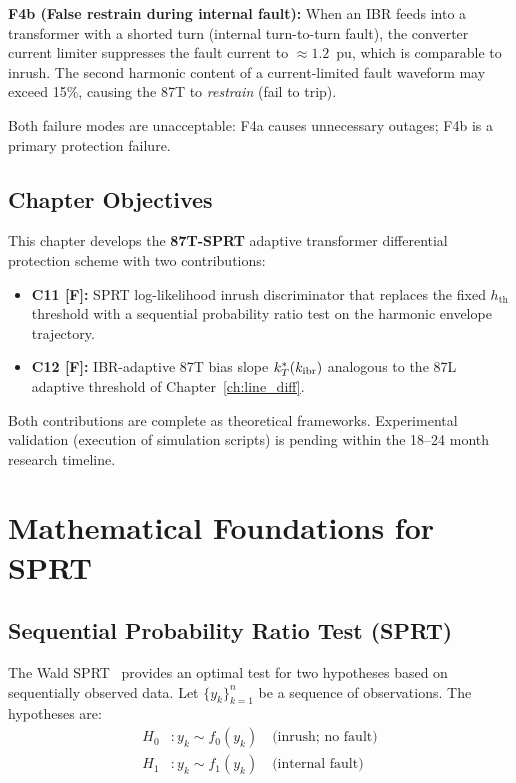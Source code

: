 \textbf{F4b (False restrain during internal fault):} When an IBR feeds
into a transformer with a shorted turn (internal turn-to-turn fault),
the converter current limiter suppresses the fault current to $\approx 1.2$~pu,
which is comparable to inrush. The second harmonic content of a
current-limited fault waveform may exceed 15\%, causing the 87T to
\emph{restrain} (fail to trip).

Both failure modes are unacceptable: F4a causes unnecessary outages;
F4b is a primary protection failure.

\subsection{Chapter Objectives}

This chapter develops the \textbf{87T-SPRT} adaptive transformer
differential protection scheme with two contributions:

\begin{itemize}
\item \textbf{C11 [F]:} SPRT log-likelihood inrush discriminator that
      replaces the fixed $h_\mathrm{th}$ threshold with a sequential
      probability ratio test on the harmonic envelope trajectory.
\item \textbf{C12 [F]:} IBR-adaptive 87T bias slope $k_T^*(k_\mathrm{ibr})$
      analogous to the 87L adaptive threshold of Chapter~\ref{ch:line_diff}.
\end{itemize}

Both contributions are complete as theoretical frameworks. Experimental
validation (execution of simulation scripts) is pending within the
18--24 month research timeline.

\section{Mathematical Foundations for SPRT}
\label{sec:ch6_sprt_theory}

\subsection{Sequential Probability Ratio Test (SPRT)}

The Wald SPRT~\citep{Wald1947} provides an optimal test for two
hypotheses based on sequentially observed data. Let
$\{y_k\}_{k=1}^n$ be a sequence of observations. The hypotheses are:
\begin{align}
  H_0 &: y_k \sim f_0(y_k) \quad \text{(inrush; no fault)} \\
  H_1 &: y_k \sim f_1(y_k) \quad \text{(internal fault)} \\
\end{align}

